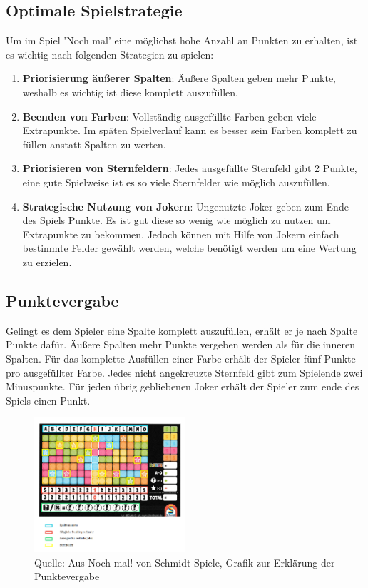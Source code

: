 \subsection{Optimale Spielstrategie}
Um im Spiel 'Noch mal' eine möglichst hohe Anzahl an Punkten zu erhalten, ist es wichtig nach folgenden Strategien zu spielen:
\begin{enumerate}
    \item \textbf{Priorisierung äußerer Spalten}: Äußere Spalten geben mehr Punkte, weshalb es wichtig ist diese komplett auszufüllen.
    \item \textbf{Beenden von Farben}: Vollständig ausgefüllte Farben geben viele Extrapunkte. Im späten Spielverlauf kann es besser sein Farben komplett zu füllen anstatt Spalten zu werten.
    \item \textbf{Priorisieren von Sternfeldern}: Jedes ausgefüllte Sternfeld gibt 2 Punkte, eine gute Spielweise ist es so viele Sternfelder wie möglich auszufüllen.
    \item \textbf{Strategische Nutzung von Jokern}: Ungenutzte Joker geben zum Ende des Spiels Punkte. Es ist gut diese so wenig wie möglich zu nutzen um Extrapunkte zu bekommen. Jedoch können mit Hilfe von Jokern einfach bestimmte Felder gewählt werden, welche benötigt werden um eine Wertung zu erzielen.
\end{enumerate}

\subsection{Punktevergabe}
Gelingt es dem  Spieler eine Spalte komplett auszufüllen, erhält er je nach Spalte Punkte dafür. Äußere Spalten mehr Punkte vergeben werden als für die inneren Spalten.
Für das komplette Ausfüllen einer Farbe erhält der Spieler fünf Punkte pro ausgefüllter Farbe.
Jedes nicht angekreuzte Sternfeld gibt zum Spielende zwei Minuspunkte.
Für jeden übrig gebliebenen Joker erhält der Spieler zum ende des Spiels einen Punkt.
\begin{figure}[!h]
	\centering
	\includegraphics[width=0.5\textwidth]{Bilder/Abbildung2.png}
	\caption{Quelle: Aus Noch mal! von Schmidt Spiele, Grafik zur Erklärung der Punktevergabe}
\end{figure}

